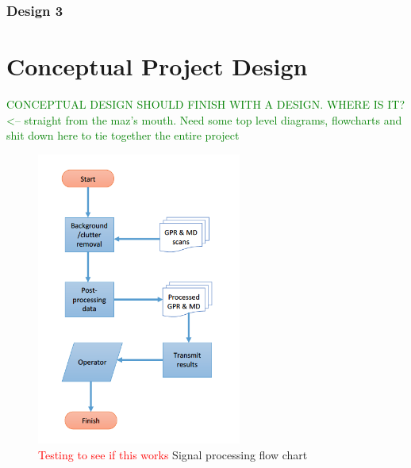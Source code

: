 \documentclass[main.tex]{subfiles}
\begin{document}
\subsubsection{Design 3}
  
\section{Conceptual Project Design}
\textcolor{green}{CONCEPTUAL DESIGN SHOULD FINISH WITH A DESIGN. WHERE IS IT? <-- straight from the maz's mouth. Need some top level diagrams, flowcharts and shit down here to tie together the entire project}


\begin{figure}[ht]
\includegraphics[width = 0.6\textwidth]{4-ConceptDesign/SP_flowchart.png}
\centering
\caption{\textcolor{red}{Testing to see if this works } Signal processing flow chart} 
\end{figure}
\end{document}
